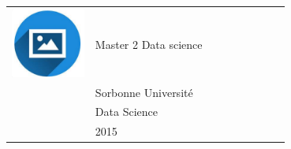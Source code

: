 \documentclass{article}
\begin{document}
\begin{paracol}{2}
 \begin{tabular}{@{}cp{0.7\linewidth}}
      \begin{minipage}{0.05\linewidth}
        \includegraphics[width=\linewidth]{picon.png}
      \end{minipage} & \vspace{-12pt}
      {\color{sidetext} {Master 2 Data science}} \\[-6pt]
      & {Sorbonne Université} \\
      & {Data Science} \\
      & {2015} 
    \end{tabular}


~

~


\end{paracol}
\end{document}
